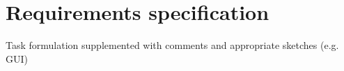 \chapter{Requirements specification}
Task formulation supplemented with comments and appropriate sketches (e.g. GUI)

